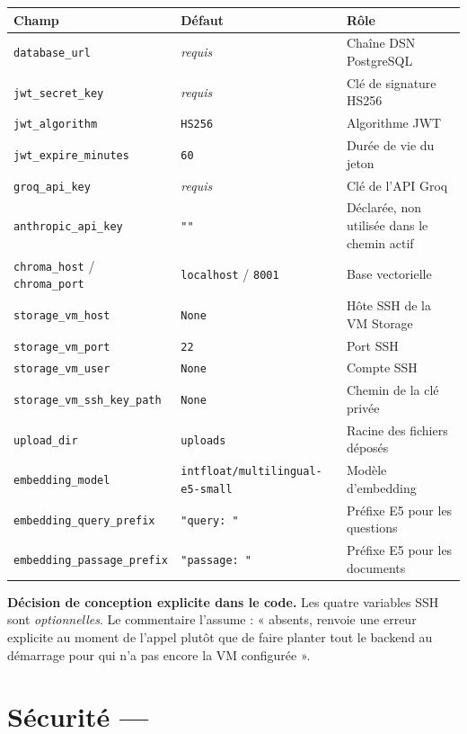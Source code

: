 \begin{longtable}{@{}p{4.4cm}p{2.4cm}p{7.9cm}@{}}
\toprule
\textbf{Champ} & \textbf{Défaut} & \textbf{Rôle}\\
\midrule
\endhead
\texttt{database\_url} & \emph{requis} & Chaîne DSN PostgreSQL\\
\texttt{jwt\_secret\_key} & \emph{requis} & Clé de signature HS256\\
\texttt{jwt\_algorithm} & \texttt{HS256} & Algorithme JWT\\
\texttt{jwt\_expire\_minutes} & \texttt{60} & Durée de vie du jeton\\
\texttt{groq\_api\_key} & \emph{requis} & Clé de l'API Groq\\
\texttt{anthropic\_api\_key} & \texttt{""} & Déclarée, non utilisée dans le chemin actif\\
\texttt{chroma\_host} / \texttt{chroma\_port} & \texttt{localhost} / \texttt{8001} & Base vectorielle\\
\texttt{storage\_vm\_host} & \texttt{None} & Hôte SSH de la VM Storage\\
\texttt{storage\_vm\_port} & \texttt{22} & Port SSH\\
\texttt{storage\_vm\_user} & \texttt{None} & Compte SSH\\
\texttt{storage\_vm\_ssh\_key\_path} & \texttt{None} & Chemin de la clé privée\\
\texttt{upload\_dir} & \texttt{uploads} & Racine des fichiers déposés\\
\texttt{embedding\_model} & \texttt{intfloat/multilingual-e5-small} & Modèle d'embedding\\
\texttt{embedding\_query\_prefix} & \texttt{"query: "} & Préfixe E5 pour les questions\\
\texttt{embedding\_passage\_prefix} & \texttt{"passage: "} & Préfixe E5 pour les documents\\
\bottomrule
\end{longtable}

\begin{keybox}
\textbf{Décision de conception explicite dans le code.} Les quatre variables
SSH sont \emph{optionnelles}. Le commentaire l'assume : « absents,
 renvoie une erreur explicite au moment de l'appel plutôt que
de faire planter tout le backend au démarrage pour qui n'a pas encore la VM
configurée ».
\end{keybox}

\section{Sécurité --- }

